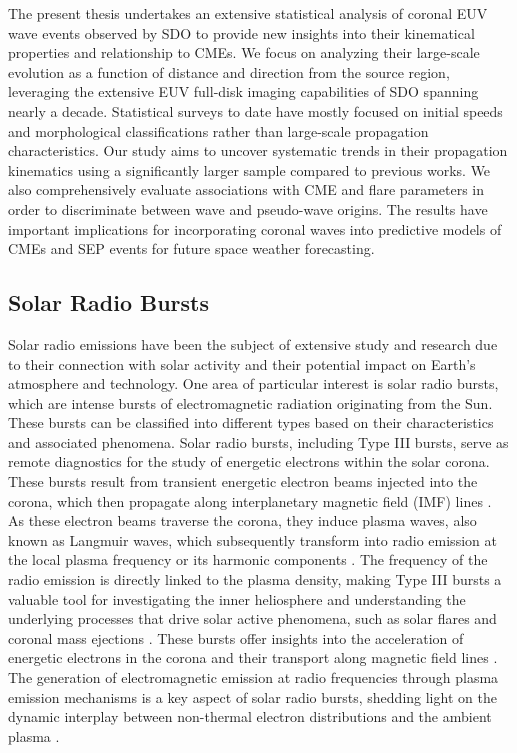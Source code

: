 The present thesis undertakes an extensive statistical analysis of coronal EUV wave events observed by SDO to provide new insights into their kinematical properties and relationship to CMEs. We focus on analyzing their large-scale evolution as a function of distance and direction from the source region, leveraging the extensive EUV full-disk imaging capabilities of SDO spanning nearly a decade. Statistical surveys to date have mostly focused on initial speeds and morphological classifications rather than large-scale propagation characteristics. Our study aims to uncover systematic trends in their propagation kinematics using a significantly larger sample compared to previous works. We also comprehensively evaluate associations with CME and flare parameters in order to discriminate between wave and pseudo-wave origins. The results have important implications for incorporating coronal waves into predictive models of CMEs and SEP events for future space weather forecasting.

\subsection{Solar Radio Bursts}
Solar radio emissions have been the subject of extensive study and research due to their connection with solar activity and their potential impact on Earth's atmosphere and technology. One area of particular interest is solar radio bursts, which are intense bursts of electromagnetic radiation originating from the Sun. These bursts can be classified into different types based on their characteristics and associated phenomena. Solar radio bursts, including Type III bursts, serve as remote diagnostics for the study of energetic electrons within the solar corona. These bursts result from transient energetic electron beams injected into the corona, which then propagate along interplanetary magnetic field (IMF) lines \citep{ergun_1998, pick_2006, reid_2020}. As these electron beams traverse the corona, they induce plasma waves, also known as Langmuir waves, which subsequently transform into radio emission at the local plasma frequency or its harmonic components \citep{melrose_2017}.
The frequency of the radio emission is directly linked to the plasma density, making Type III bursts a valuable tool for investigating the inner heliosphere and understanding the underlying processes that drive solar active phenomena, such as solar flares and coronal mass ejections \citep{reid_2014, kontar_2017}. These bursts offer insights into the acceleration of energetic electrons in the corona and their transport along magnetic field lines \citep{reid_2014}. The generation of electromagnetic emission at radio frequencies through plasma emission mechanisms is a key aspect of solar radio bursts, shedding light on the dynamic interplay between non-thermal electron distributions and the ambient plasma \citep{melrose_1980}.

